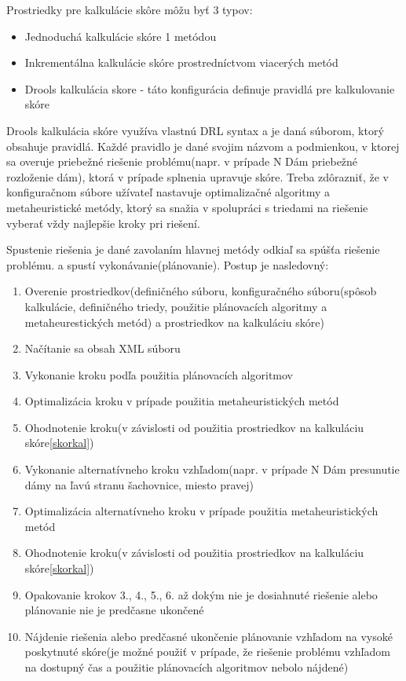  Prostriedky pre kalkulácie skôre môžu byť 3 typov:
\begin{itemize}\label{skorkal}
\item Jednoduchá kalkulácie skóre 1 metódou
\item Inkrementálna kalkulácie skóre prostredníctvom viacerých metód
\item Drools kalkulácia skore - táto konfigurácia definuje pravidlá pre kalkulovanie skóre\label{drollskal}
\end{itemize}
Drools kalkulácia skóre využíva vlastnú DRL syntax a je daná súborom, ktorý obsahuje pravidlá. Každé pravidlo je dané svojim názvom a podmienkou, v ktorej sa overuje priebežné riešenie problému(napr. v prípade N Dám priebežné rozloženie dám), ktorá v prípade splnenia upravuje skóre. Treba zdôrazniť, že v konfiguračnom súbore užívateľ nastavuje optimalizačné algoritmy a metaheuristické metódy, ktorý sa snažia v spolupráci s triedami na riešenie vyberať vždy najlepšie kroky pri riešení.

 Spustenie riešenia je dané zavolaním hlavnej metódy odkiaľ sa spúšťa riešenie problému. 
a spustí vykonávanie(plánovanie). Postup je nasledovný:
\begin{enumerate}
\item Overenie prostriedkov(definičného súboru, konfiguračného súboru(spôsob kalkulácie, definičného triedy, použitie plánovacích algoritmy a metaheurestických metód) a prostriedkov na kalkuláciu skóre)
\item Načítanie sa obsah XML súboru 
\item Vykonanie kroku podľa použitia plánovacích algoritmov
\item Optimalizácia kroku v prípade použitia metaheuristických metód
\item Ohodnotenie kroku(v závislosti od použitia prostriedkov na kalkuláciu skóre\ref{skorkal})
\item Vykonanie alternatívneho kroku vzhľadom(napr. v prípade N Dám presunutie dámy na ľavú stranu šachovnice, miesto pravej)
\item Optimalizácia alternatívneho kroku v prípade použitia metaheuristických metód
\item Ohodnotenie kroku(v závislosti od použitia prostriedkov na kalkuláciu skóre\ref{skorkal})
\item Opakovanie krokov 3., 4., 5., 6. až dokým nie je dosiahnuté riešenie alebo plánovanie nie je predčasne ukončené
\item Nájdenie riešenia alebo predčasné ukončenie plánovanie vzhľadom na vysoké poskytnuté skóre(je možné použiť v prípade, že riešenie problému vzhľadom na dostupný čas a použitie plánovacích algoritmov nebolo nájdené)

\end{enumerate}

